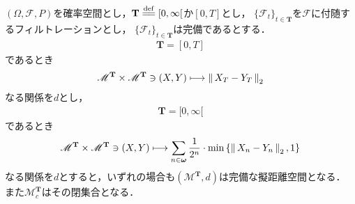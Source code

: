 	\begin{screen}
		\begin{thm}\label{thm:pseudo_metric_on_square_integrable_martingales}
			$(\Omega,\mathscr{F},P)$を確率空間とし，$\mathbf{T} \defeq [0,\infty[$か$[0,T]$とし，
			$\{\mathscr{F}_t\}_{t \in \mathbf{T}}$を$\mathscr{F}$に付随するフィルトレーションとし，
			$\{\mathscr{F}_t\}_{t \in \mathbf{T}}$は完備であるとする．
			\begin{align}
				\mathbf{T} = [0,T]
			\end{align}
			であるとき
			\begin{align}
				\mathscr{M}^{\mathbf{T}} \times \mathscr{M}^{\mathbf{T}} \ni (X,Y) \longmapsto
				\left\|\, X_T - Y_T\, \right\|_{2}
			\end{align}
			なる関係を$d$とし，
			\begin{align}
				\mathbf{T} = [0,\infty[
			\end{align}
			であるとき
			\begin{align}
				\mathscr{M}^{\mathbf{T}} \times \mathscr{M}^{\mathbf{T}} \ni (X,Y) \longmapsto
				\sum_{n \in {\boldsymbol \omega}} \frac{1}{2^n} \cdot \min \left\{ \left\|\, X_n - Y_n\, \right\|_{2},1 \right\}
			\end{align}
			なる関係を$d$とすると，いずれの場合も$\left(\mathscr{M}^{\mathbf{T}},d\right)$は完備な擬距離空間となる．
			また$\mathscr{M}^{\mathbf{T}}_c$はその閉集合となる．
		\end{thm}
	\end{screen}
	
